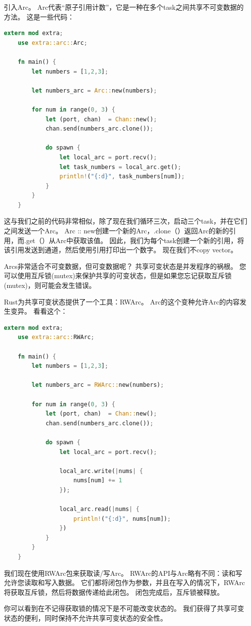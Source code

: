 引入Arc。 Arc代表“原子引用计数”，它是一种在多个task之间共享不可变数据的方法。 这是一些代码：
\begin{lstlisting}[language={Rust}, label={code:forktest},
	caption={forktest.rs}]
	extern mod extra;
	use extra::arc::Arc;
	
	fn main() {
		let numbers = [1,2,3];
		
		let numbers_arc = Arc::new(numbers);
		
		for num in range(0, 3) {
			let (port, chan)  = Chan::new();
			chan.send(numbers_arc.clone());
			
			do spawn {
				let local_arc = port.recv();
				let task_numbers = local_arc.get();
				println!("{:d}", task_numbers[num]);
			}
		}
	}
\end{lstlisting}

这与我们之前的代码非常相似，除了现在我们循环三次，启动三个task，并在它们之间发送一个Arc。 Arc :: new创建一个新的Arc，.clone（）返回Arc的新的引用，而.get（）从Arc中获取该值。 因此，我们为每个task创建一个新的引用，将该引用发送到通道，然后使用引用打印出一个数字。 现在我们不copy vector。

Arcs非常适合不可变数据，但可变数据呢？ 共享可变状态是并发程序的祸根。 您可以使用互斥锁(mutex)来保护共享的可变状态，但是如果您忘记获取互斥锁(mutex)，则可能会发生错误。

Rust为共享可变状态提供了一个工具：RWArc。 Arc的这个变种允许Arc的内容发生变异。 看看这个：
\begin{lstlisting}[language={Rust}, label={code:forktest},
	caption={forktest.rs}]
	extern mod extra;
	use extra::arc::RWArc;
	
	fn main() {
		let numbers = [1,2,3];
		
		let numbers_arc = RWArc::new(numbers);
		
		for num in range(0, 3) {
			let (port, chan)  = Chan::new();
			chan.send(numbers_arc.clone());
			
			do spawn {
				let local_arc = port.recv();
				
				local_arc.write(|nums| {
					nums[num] += 1
				});
				
				local_arc.read(|nums| {
					println!("{:d}", nums[num]);
				})
			}
		}
	}
\end{lstlisting}

我们现在使用RWArc包来获取读/写Arc。 RWArc的API与Arc略有不同：读和写允许您读取和写入数据。 它们都将闭包作为参数，并且在写入的情况下，RWArc将获取互斥锁，然后将数据传递给此闭包。 闭包完成后，互斥锁被释放。

你可以看到在不记得获取锁的情况下是不可能改变状态的。 我们获得了共享可变状态的便利，同时保持不允许共享可变状态的安全性。


